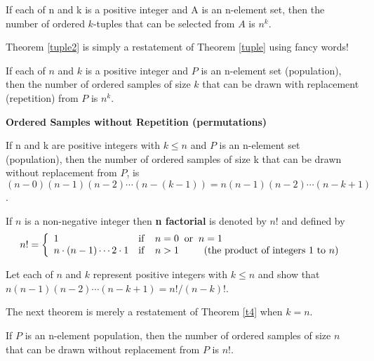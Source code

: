 \begin{thm}
\label{tuple}
If each of n and k is a positive integer and A is an n-element set, then the number of ordered $k$-tuples that can be selected from $A$ is $n^k$.
\end{thm}

Theorem \ref{tuple2} is simply a restatement of Theorem \ref{tuple} using fancy words!

\begin{thm}
\label{tuple2}
If each of $n$ and $k$ is a positive integer and $P$ is an n-element set (population),  then the number of ordered samples of size $k$ that can be drawn with replacement (repetition) from $P$ is $n^k$.
\end{thm}

\noindent
\textbf{Ordered Samples without Repetition (permutations)}

\begin{thm}
\label{t4}
If n and k are positive integers with $k \leq n$ and $P$ is an n-element set (population), then the number of ordered samples of size k that can be drawn without replacement from $P$, is $(n-0)(n-1)(n-2) \cdots (n-(k-1)) = n  (n - 1)  (n - 2)  \cdots  (n - k + 1)$.
\end{thm}

\begin{dfn}
If $n$ is a non-negative integer then \textbf{n factorial} is denoted by $n!$ and defined by
$$n! =  \left\{
         \begin{array}{ll}
         1 & \mbox{if} \;\;\;\; n=0 \; \; \mbox{or} \; \; n=1 \\
         n \cdot (n - 1)   \cdots  2 \cdot 1 & \mbox{if}  \;\;\;\; n > 1 \; \; \mbox{\qquad $($the product of integers $1$ to $n)$}
    \end{array}
    \right.$$
\end{dfn}

\begin{prb}
Let each of $n$ and $k$ represent positive integers with $k \leq n$ and show that $n(n - 1)(n - 2) \cdots (n - k + 1) = n!/(n - k)!$.
\end{prb}

The next theorem is merely a restatement of Theorem \ref{t4} when $k=n$.

\begin{thm}
If $P$ is an n-element population, then the number of ordered samples of size $n$ that can be drawn without replacement from $P$ is $n!$.
\end{thm}

